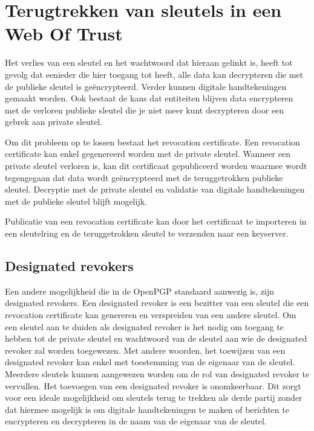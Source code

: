 \section{Terugtrekken van sleutels in een Web Of Trust}
\label{sec:terugtrekken-van-sleutels-in-een-wot}

Het verlies van een sleutel en het wachtwoord dat hieraan gelinkt is, heeft tot
gevolg dat eenieder die hier toegang tot heeft, alle data kan decrypteren die
met de publieke sleutel is geëncrypteerd. Verder kunnen digitale handtekeningen
gemaakt worden. Ook bestaat de kans dat entiteiten blijven data encrypteren met de
verloren publieke sleutel die je niet meer kunt decrypteren door een gebrek aan
private sleutel.

Om dit probleem op te lossen bestaat het revocation certificate. Een revocation
certificate kan enkel gegenereerd worden met de private sleutel. Wanneer een
private sleutel verloren is, kan dit certificaat gepubliceerd worden waarmee
wordt tegengegaan dat data wordt geëncrypteerd met de teruggetrokken publieke
sleutel. Decryptie met de private sleutel en validatie van digitale
handtekeningen met de publieke sleutel blijft mogelijk.
\autocite{GNUManualGettingStarted}

Publicatie van een revocation certificate kan door het certificaat te importeren
in een sleutelring en de teruggetrokken sleutel te verzenden naar een keyserver.

\subsection{Designated revokers}
\label{subsec:designated-revokers}

Een andere mogelijkheid die in de \gls{OpenPGP} standaard aanwezig is, zijn designated
revokers. Een designated revoker is een bezitter van een sleutel die een
revocation certificate kan genereren en verspreiden van een andere sleutel.
\autocite{rfc4880} Om een sleutel aan te duiden als designated revoker is het
nodig om toegang te hebben tot de private sleutel en wachtwoord van de sleutel
aan wie de designated revoker zal worden toegewezen. Met andere woorden, het
toewijzen van een designated revoker kan enkel met toestemming van de eigenaar
van de sleutel. Meerdere sleutels kunnen aangewezen worden om de rol van
designated revoker te vervullen. Het toevoegen van een designated revoker is
onomkeerbaar. Dit zorgt voor een ideale mogelijkheid om sleutels terug te
trekken als derde partij zonder dat hiermee mogelijk is om digitale
handtekeningen te maken of berichten te encrypteren en decrypteren in de naam
van de eigenaar van de sleutel.

